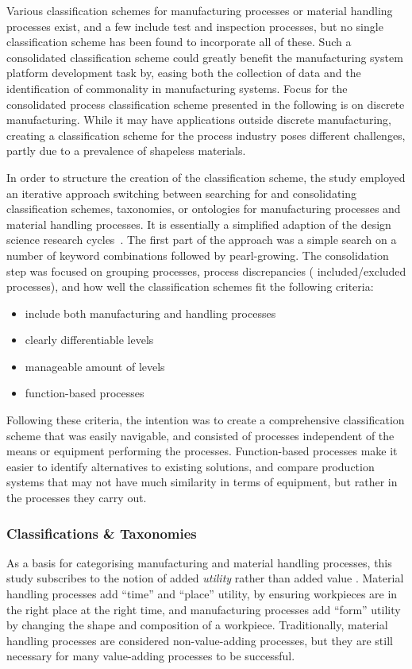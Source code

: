 Various classification schemes for manufacturing processes or material handling processes exist, and a few include test and inspection processes, but no single classification scheme has been found to incorporate all of these.
Such a consolidated classification scheme could greatly benefit the manufacturing system platform development task by, easing both the collection of data and the identification of commonality in manufacturing systems.
Focus for the consolidated process classification scheme presented in the following is on discrete manufacturing.
While it may have applications outside discrete manufacturing, creating a classification scheme for the process industry poses different challenges, partly due to a prevalence of shapeless materials.

In order to structure the creation of the classification scheme, the study employed an iterative approach switching between searching for and consolidating classification schemes, taxonomies, or ontologies for manufacturing processes and material handling processes.
It is essentially a simplified adaption of the design science research cycles~\parencite{Hevner2007TheTC}.
The first part of the approach was a simple search on a number of keyword combinations followed by pearl-growing.
The consolidation step was focused on grouping processes, process discrepancies (\eg{} included/excluded processes), and how well the classification schemes fit the following criteria:
\begin{itemize}
  \item include both manufacturing and handling processes
  \item clearly differentiable levels
  \item manageable amount of levels
  \item function-based processes
\end{itemize}
Following these criteria, the intention was to create a comprehensive classification scheme that was easily navigable, and consisted of processes independent of the means or equipment performing the processes.
Function-based processes make it easier to identify alternatives to existing solutions, and compare production systems that may not have much similarity in terms of equipment, but rather in the processes they carry out.

\subsubsection*{Classifications \& Taxonomies}
As a basis for categorising manufacturing and material handling processes, this study subscribes to the notion of added \emph{utility} rather than added value \parencite{Kay12MHE,Apple1972}.
Material handling processes add ``time'' and ``place'' utility, by ensuring workpieces are in the right place at the right time, and manufacturing processes add ``form'' utility by changing the shape and composition of a workpiece.
Traditionally, material handling processes are considered non-value-adding processes, but they are still necessary for many value-adding processes to be successful.


